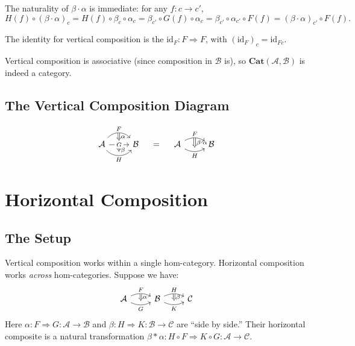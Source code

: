 The naturality of $\beta \cdot \alpha$ is immediate: for any $f: c \to c'$,
\[
  H(f) \circ (\beta \cdot \alpha)_c = H(f) \circ \beta_c \circ \alpha_c
  = \beta_{c'} \circ G(f) \circ \alpha_c = \beta_{c'} \circ \alpha_{c'} \circ F(f)
  = (\beta \cdot \alpha)_{c'} \circ F(f).
\]

The identity for vertical composition is the  $\mathrm{id}_F : F \Rightarrow F$, with
$(\mathrm{id}_F)_c = \mathrm{id}_{Fc}$.

Vertical composition is associative (since composition in $\mathcal{B}$
is), so $\mathbf{Cat}(\mathcal{A}, \mathcal{B})$ is indeed a category.

\subsection{The Vertical Composition Diagram}

\[
  \begin{tikzcd}
    \mathcal{A}
      \arrow[r, bend left=50, "F", ""{name=F}]
      \arrow[r, "G"{description}, ""{name=G1, below}, ""{name=G2, above}]
      \arrow[r, bend right=50, "H"', ""{name=H}]
    & \mathcal{B}
    \arrow[Rightarrow, from=F, to=G2, "\alpha"]
    \arrow[Rightarrow, from=G1, to=H, "\beta"]
  \end{tikzcd}
  \quad = \quad
  \begin{tikzcd}
    \mathcal{A}
      \arrow[r, bend left=30, "F", ""{name=U}]
      \arrow[r, bend right=30, "H"', ""{name=D}]
    & \mathcal{B}
    \arrow[Rightarrow, from=U, to=D, "\beta \cdot \alpha"]
  \end{tikzcd}
\]


\section{Horizontal Composition}
\label{sec:horizontal}

\subsection{The Setup}

Vertical composition works within a single hom-category. Horizontal
composition works \emph{across} hom-categories. Suppose we have:
\[
  \begin{tikzcd}
    \mathcal{A}
      \arrow[r, bend left=25, "F", ""{name=F1}]
      \arrow[r, bend right=25, "G"', ""{name=G1}]
    & \mathcal{B}
      \arrow[r, bend left=25, "H", ""{name=H1}]
      \arrow[r, bend right=25, "K"', ""{name=K1}]
    & \mathcal{C}
    \arrow[Rightarrow, from=F1, to=G1, "\alpha"]
    \arrow[Rightarrow, from=H1, to=K1, "\beta"]
  \end{tikzcd}
\]
Here $\alpha: F \Rightarrow G: \mathcal{A} \to \mathcal{B}$ and
$\beta: H \Rightarrow K: \mathcal{B} \to \mathcal{C}$ are ``side by
side.'' Their horizontal composite is a natural transformation
$\beta * \alpha: H \circ F \Rightarrow K \circ G: \mathcal{A} \to
\mathcal{C}$.

